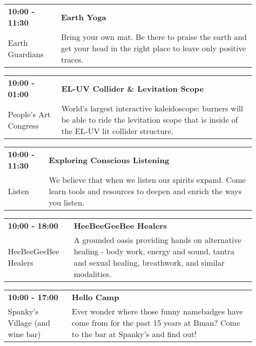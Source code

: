 \begin{tabular}{ p{1in} p{2.2in} }
    \textbf{10:00 - 11:30} & \textbf{Earth Yoga} \\
    Earth Guardians \newline  & Bring your own mat. Be there to praise the earth and get your head in the right place to leave only positive traces. \\
    \hline 
\end{tabular}
    
\begin{tabular}{ p{1in} p{2.2in} }
    \textbf{10:00 - 01:00} & \textbf{EL-UV Collider \& Levitation Scope} \\
    People's Art Congress \newline  & World's largest interactive kaleidoscope: burners will be able to ride the levitation scope that is inside of the EL-UV lit collider structure. \\
    \hline 
\end{tabular}
    
\begin{tabular}{ p{1in} p{2.2in} }
    \textbf{10:00 - 11:30} & \textbf{Exploring Conscious Listening} \\
    Listen \newline  & We believe that when we listen our spirits expand. Come learn tools and resources to deepen and enrich the ways you listen. \\
    \hline 
\end{tabular}
    
\begin{tabular}{ p{1in} p{2.2in} }
    \textbf{10:00 - 18:00} & \textbf{HeeBeeGeeBee Healers} \\
    HeeBeeGeeBee Healers \newline  & A grounded oasis providing hands on alternative healing - body work, energy and sound, tantra and sexual healing, breathwork, and similar modalities. \\
    \hline 
\end{tabular}
    
\begin{tabular}{ p{1in} p{2.2in} }
    \textbf{10:00 - 17:00} & \textbf{Hello Camp} \\
    Spanky's Village (and wine bar) \newline  & Ever wonder where those funny namebadges have come from for the past 15 years at Bman?  Come to the bar at Spanky's and find out! \\
    \hline 
\end{tabular}
    
